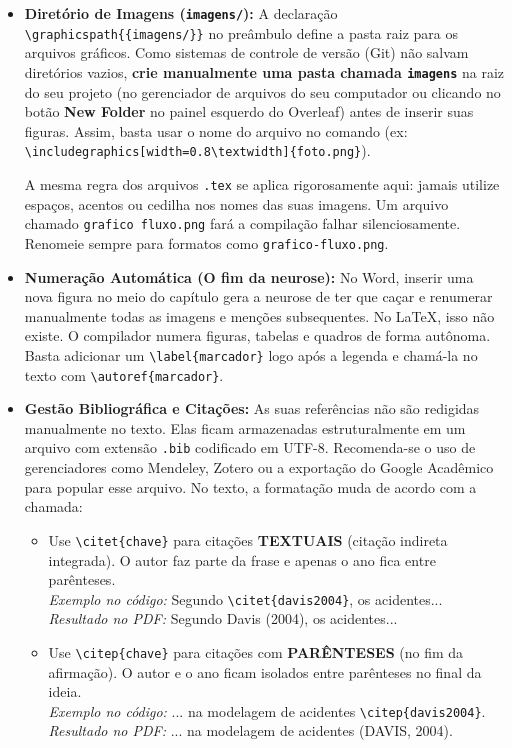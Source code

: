 \documentclass[12pt, a4paper]{article}
\begin{document}
\begin{itemize}
    \item \textbf{Diretório de Imagens (\texttt{imagens/}):} A declaração \texttt{\textbackslash graphicspath\{\{imagens/\}\}} no preâmbulo define a pasta raiz para os arquivos gráficos. Como sistemas de controle de versão (Git) não salvam diretórios vazios, \textbf{crie manualmente uma pasta chamada \texttt{imagens}} na raiz do seu projeto (no gerenciador de arquivos do seu computador ou clicando no botão \textbf{New Folder} no painel esquerdo do Overleaf) antes de inserir suas figuras. Assim, basta usar o nome do arquivo no comando (ex: \texttt{\textbackslash includegraphics[width=0.8\textbackslash textwidth]\{foto.png\}}). 
    
    \begin{atencao}
    A mesma regra dos arquivos \texttt{.tex} se aplica rigorosamente aqui: jamais utilize espaços, acentos ou cedilha nos nomes das suas imagens. Um arquivo chamado \texttt{grafico fluxo.png} fará a compilação falhar silenciosamente. Renomeie sempre para formatos como \texttt{grafico-fluxo.png}.
    \end{atencao}
    
    \item \textbf{Numeração Automática (O fim da neurose):} No Word, inserir uma nova figura no meio do capítulo gera a neurose de ter que caçar e renumerar manualmente todas as imagens e menções subsequentes. No \LaTeX, isso não existe. O compilador numera figuras, tabelas e quadros de forma autônoma. Basta adicionar um \texttt{\textbackslash label\{marcador\}} logo após a legenda e chamá-la no texto com \texttt{\textbackslash autoref\{marcador\}}.
    
    \item \textbf{Gestão Bibliográfica e Citações:} As suas referências não são redigidas manualmente no texto. Elas ficam armazenadas estruturalmente em um arquivo com extensão \texttt{.bib} codificado em UTF-8. Recomenda-se o uso de gerenciadores como Mendeley, Zotero ou a exportação do Google Acadêmico para popular esse arquivo. No texto, a formatação muda de acordo com a chamada:
    \begin{itemize}
        \item Use \texttt{\textbackslash citet\{chave\}} para citações \textbf{TEXTUAIS} (citação indireta integrada). O autor faz parte da frase e apenas o ano fica entre parênteses.\\ \textit{Exemplo no código:} Segundo \texttt{\textbackslash citet\{davis2004\}}, os acidentes...\\ \textit{Resultado no PDF:} Segundo Davis (2004), os acidentes...
        \item Use \texttt{\textbackslash citep\{chave\}} para citações com \textbf{PARÊNTESES} (no fim da afirmação). O autor e o ano ficam isolados entre parênteses no final da ideia.\\ \textit{Exemplo no código:} ... na modelagem de acidentes \texttt{\textbackslash citep\{davis2004\}}.\\ \textit{Resultado no PDF:} ... na modelagem de acidentes (DAVIS, 2004).
    \end{itemize}
    

\end{itemize}
\end{document}
